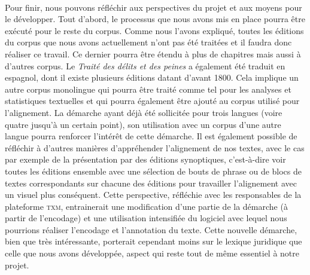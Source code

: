 \paragraph{} Pour finir, nous pouvons réfléchir aux perspectives du projet et aux moyens pour le développer. Tout d'abord, le processus que nous avons mis en place pourra être exécuté pour le reste du corpus. Comme nous l'avons expliqué, toutes les éditions du corpus que nous avons actuellement n'ont pas été traitées et il faudra donc réaliser ce travail. Ce dernier pourra être étendu à plus de chapitres mais aussi à d'autres corpus. Le \emph{Traité des délits et des peines} a également été traduit en espagnol, dont il existe plusieurs éditions datant d'avant 1800. Cela implique un autre corpus monolingue qui pourra être traité comme tel pour les analyses et statistiques textuelles et qui pourra également être ajouté au corpus utilisé pour l'alignement. La démarche ayant déjà été sollicitée pour trois langues (voire quatre jusqu'à un certain point), son utilisation avec un corpus d'une autre langue pourra renforcer l'intérêt de cette démarche. Il est également possible de réfléchir à d'autres manières d'appréhender l'alignement de nos textes, avec le cas par exemple de la présentation par des éditions synoptiques, c'est-à-dire voir toutes les éditions ensemble avec une sélection de bouts de phrase ou de blocs de textes correspondants sur chacune des éditions pour travailler l'alignement avec un visuel plus conséquent. Cette perspective, réfléchie avec les responsables de la plateforme \textsc{txm}, entrainerait une modification d'une partie de la démarche (à partir de l'encodage) et une utilisation intensifiée du logiciel avec lequel nous pourrions réaliser l'encodage et l'annotation du texte. Cette nouvelle démarche, bien que très intéressante, porterait cependant moins sur le lexique juridique que celle que nous avons développée, aspect qui reste tout de même essentiel à notre projet.